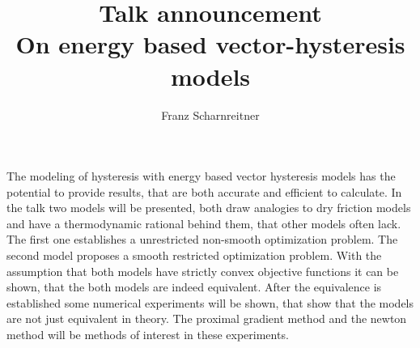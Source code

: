 \documentclass[UTF8]{article}
\date{\displaydate{date}}
\title{%
Talk announcement \\
\large On energy based vector-hysteresis models}
\author{Franz Scharnreitner}
\begin{document}
\maketitle
The modeling of hysteresis with energy based vector hysteresis models has the potential to provide results, that are both accurate and efficient to calculate. In the talk two models will be presented, both draw analogies to dry friction models and have a thermodynamic rational behind them, that other models often lack. The first one establishes a unrestricted non-smooth optimization problem. The second model proposes a smooth restricted optimization problem. With the assumption that both models have strictly convex objective functions it can be shown, that the both models are indeed equivalent. After the equivalence is established some numerical experiments will be shown, that show that the models are not just equivalent in theory. The proximal gradient method and the newton method will be methods of interest in these experiments. 
\end{document}
